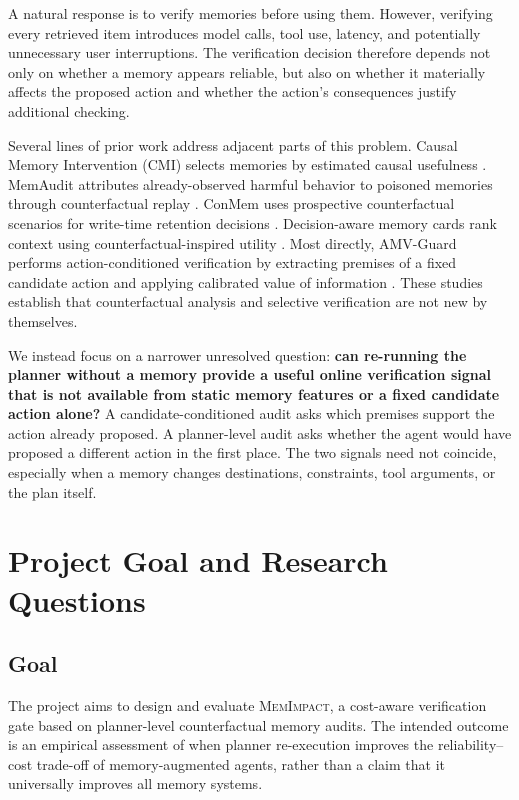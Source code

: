 \documentclass[11pt]{article}
\newcommand{\method}{\textsc{MemImpact}}
\begin{document}
A natural response is to verify memories before using them. However, verifying every retrieved item introduces model calls, tool use, latency, and potentially unnecessary user interruptions. The verification decision therefore depends not only on whether a memory appears reliable, but also on whether it materially affects the proposed action and whether the action's consequences justify additional checking.

Several lines of prior work address adjacent parts of this problem. Causal Memory Intervention (CMI) selects memories by estimated causal usefulness \cite{srivastava2026cmi}. MemAudit attributes already-observed harmful behavior to poisoned memories through counterfactual replay \cite{tan2026memaudit}. ConMem uses prospective counterfactual scenarios for write-time retention decisions \cite{zhang2026conmem}. Decision-aware memory cards rank context using counterfactual-inspired utility \cite{guan2026cicl}. Most directly, AMV-Guard performs action-conditioned verification by extracting premises of a fixed candidate action and applying calibrated value of information \cite{wang2026amv}. These studies establish that counterfactual analysis and selective verification are not new by themselves.

We instead focus on a narrower unresolved question: \textbf{can re-running the planner without a memory provide a useful online verification signal that is not available from static memory features or a fixed candidate action alone?} A candidate-conditioned audit asks which premises support the action already proposed. A planner-level audit asks whether the agent would have proposed a different action in the first place. The two signals need not coincide, especially when a memory changes destinations, constraints, tool arguments, or the plan itself.

\section{Project Goal and Research Questions}

\subsection{Goal}

The project aims to design and evaluate \method, a cost-aware verification gate based on planner-level counterfactual memory audits. The intended outcome is an empirical assessment of when planner re-execution improves the reliability--cost trade-off of memory-augmented agents, rather than a claim that it universally improves all memory systems.
\end{document}
